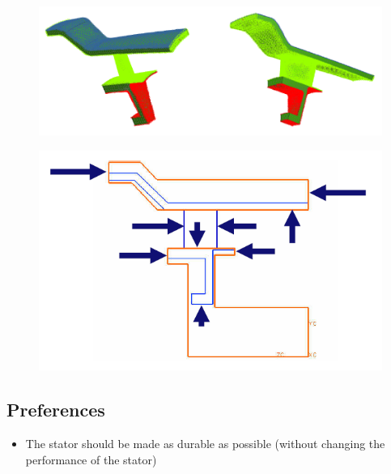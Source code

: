 \begin{figure}[h!]
\centering
\begin{minipage}{.5\textwidth}
  \centering
  \includegraphics[width=1\linewidth]{Figures/temperature.png}
  \label{Temperature of the stator}
\end{minipage}%
\begin{minipage}{.5\textwidth}
  \centering
  \includegraphics[width=1\linewidth]{Figures/constraints.png}
  \label{orange outline}
\end{minipage}
\end{figure}
\subsection*{Preferences}
\begin{itemize}
\item The stator should be made as durable as possible (without changing the performance of the stator)
\end{itemize}

